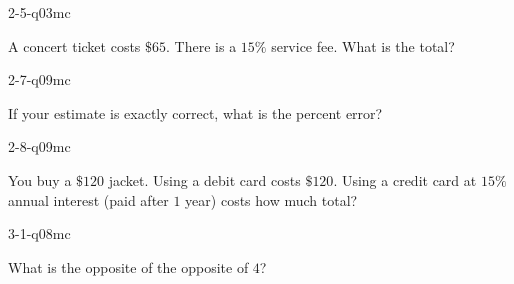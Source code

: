 \begin{practiceQuestion}{2-5-q03}{mc}
\begin{questionText}
A concert ticket costs $\$65$. There is a $15\%$ service fee. What is the total?
\end{questionText}
\end{practiceQuestion}

\begin{practiceQuestion}{2-7-q09}{mc}
\begin{questionText}
If your estimate is exactly correct, what is the percent error?
\end{questionText}
\end{practiceQuestion}

\begin{practiceQuestion}{2-8-q09}{mc}
\begin{questionText}
You buy a $\$120$ jacket. Using a debit card costs $\$120$. Using a credit card at $15\%$ annual interest (paid after $1$ year) costs how much total?
\end{questionText}
\end{practiceQuestion}

\begin{practiceQuestion}{3-1-q08}{mc}
\begin{questionText}
What is the opposite of the opposite of $4$?
\end{questionText}
\end{practiceQuestion}

